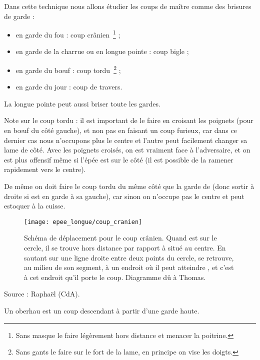 \begin{technique}
Dans cette technique nous allons étudier les coups de maître comme des brisures de garde :
\begin{itemize}
	\item \D en garde du fou : coup crânien~\footnote{Sans masque le faire légèrement hors distance et menacer la poitrine.} ;
	\item \D en garde de la charrue ou en longue pointe : coup bigle ;
	\item \D en garde du bœuf : coup tordu~\footnote{Sans gants le faire sur le fort de la lame, en principe on vise les doigts.} ;
	\item \D en garde du jour : coup de travers.
\end{itemize}
La longue pointe peut aussi briser toute les gardes.

Note sur le coup tordu : il est important de le faire en croisant les poignets (pour \D en bœuf du côté gauche), et non pas en faisant un coup furieux, car dans ce dernier cas nous n'occupons plus le centre et l'autre peut facilement changer sa lame de côté. Avec les poignets croisés, on est vraiment face à l'adversaire, et on est plus offensif même si l'épée est sur le côté (il est possible de la ramener rapidement vers le centre).

De même on doit faire le coup tordu du même côté que la garde de \D (donc sortir à droite si \D est en garde à sa gauche), car sinon on n'occupe pas le centre et \D peut estoquer à la cuisse.

\begin{figure}[ht]
	\centering
	\texttt{[image: epee\_longue/coup\_cranien]}
	\caption{Schéma de déplacement pour le coup crânien. Quand \A est sur le cercle, il se trouve hors distance par rapport à \D situé au centre. En sautant sur une ligne droite entre deux points du cercle, \A se retrouve, au milieu de son segment, à un endroit où il peut atteindre \D, et c'est à cet endroit qu'il porte le coup. Diagramme dû à Thomas.}
\end{figure}

Source : Raphaël (CdA).
\end{technique}


\begin{coup}[Oberhau]
\label{épée-longue:coup:oberhau}

Un oberhau est un coup descendant à partir d'une garde haute.

\end{coup}

